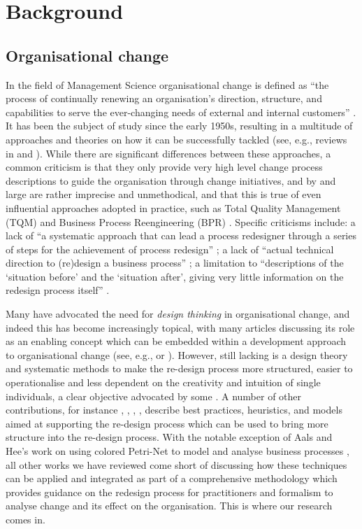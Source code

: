 \documentclass[runningheads,a4paper]{llncs}
\begin{document}
\section{Background} \label{sect:Background}

\subsection{Organisational change}
In the field of Management Science organisational change is defined as ``the process of continually renewing an organisation's direction, structure, and capabilities to serve the ever-changing needs of external and internal customers'' \cite{Moran:2000ex}. It has been the subject of study since the early 1950s, resulting in a multitude of approaches and theories on how it can be successfully tackled (see, e.g., reviews in \cite{vandeVen:1995uw} and \cite{pettigrew2001studying}). While there are significant differences between these approaches, a common criticism is that they only provide very high level change process descriptions to guide the organisation through change initiatives, and by and large are rather imprecise and unmethodical, and that this is true of even influential approaches adopted in practice, such as Total Quality Management (TQM) and Business Process Reengineering (BPR) \cite{Cao:2004dh}. Specific criticisms include: a lack of ``a systematic approach that can lead a process redesigner through a series of steps for the achievement of process redesign'' \cite{doi:10.1108/14637159910249117}; a lack of ``actual technical direction to (re)design a business process'' \cite{Reijers2005283}; a limitation to ``descriptions of the `situation before' and the `situation after', giving very little information on the redesign process itself'' \cite{Gerrits:1994:BMB:646303.686971}.

Many have advocated the need for {\it design thinking} \cite{rowe1991design} in organisational change, and indeed this has become increasingly topical, with many articles discussing its role as an enabling concept which can be embedded within a development approach to organisational change (see, e.g., \cite{3460223} or \cite{deserti2014design}). However, still lacking is a design theory and systematic methods to make the re-design process more structured, easier to operationalise and less dependent on the creativity and intuition of single individuals, a clear objective advocated by some \cite{verkerk2004trust,Kleiner:2000vm}. A number of other contributions, for instance \cite{grover1993information}, \cite{limam2007best}, \cite{reijers2005best}, \cite{berio2001enterprise}, describe best practices, heuristics, and models aimed at supporting the re-design process which can be used to bring more structure into the re-design process. With the notable exception of Aals and Hee's work on using colored Petri-Net to model and analyse business processes \cite{van1996business}, all other works we have reviewed come short of discussing how these techniques can be applied and integrated as part of a comprehensive methodology which provides guidance on the redesign process for practitioners and formalism to analyse change and its effect on the organisation. This is where our research comes in.
\end{document}
